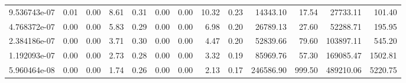 \begin{tabular}{lrrrrrrrrrrrr}
9.536743e-07 &        0.01 &        0.00 &          8.61 &          0.31 &           0.00 &           0.00 &        10.32 &         0.23 &         14343.10 &            17.54 &        27733.11 &          101.40 \\
4.768372e-07 &        0.00 &        0.00 &          5.83 &          0.29 &           0.00 &           0.00 &         6.98 &         0.20 &         26789.13 &            27.60 &        52288.71 &          195.95 \\
2.384186e-07 &        0.00 &        0.00 &          3.71 &          0.30 &           0.00 &           0.00 &         4.47 &         0.20 &         52839.66 &            79.60 &       103897.11 &          545.20 \\
1.192093e-07 &        0.00 &        0.00 &          2.73 &          0.28 &           0.00 &           0.00 &         3.32 &         0.19 &         85969.76 &            57.30 &       169085.47 &         1502.81 \\
5.960464e-08 &        0.00 &        0.00 &          1.74 &          0.26 &           0.00 &           0.00 &         2.13 &         0.17 &        246586.90 &           999.50 &       489210.06 &         5220.75 \\
\bottomrule
\end{tabular}
